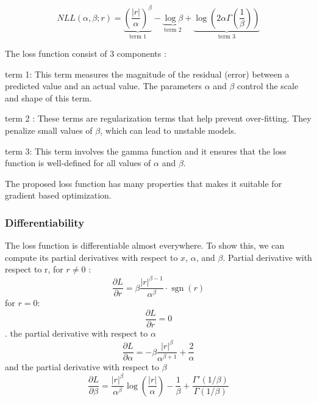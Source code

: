 \documentclass[letterpaper, 10 pt, conference]{ieeeconf}  %
\begin{document}
\begin{equation}
   NLL(\alpha, \beta; r)  = \underbrace{ \left(\frac{\left|{r}\right|}{\alpha}\right)^{\beta}}_\textrm{term 1} - \underbrace{\log{\beta}}_\textrm{term 2} + \underbrace{\log{\left( 2\alpha \Gamma\left(\frac{1}{\beta}\right)\right) }}_\textrm{term 3}
\end{equation}

The loss function consist of 3 components : 
\begin{inparaitem}
    \item 
 term 1: This term measures the magnitude of the residual (error) between a predicted value and an actual value. The parameters $\alpha$ and $\beta$ control the scale and shape of this term.
     \item term 2 : These terms are regularization terms that help prevent over-fitting. They penalize small values of $\beta$, which can lead to unstable models.
    \item term 3: This term involves the gamma function and it ensures that the loss function is well-defined for all values of $\alpha$ and $\beta$.
\end{inparaitem}

The proposed loss function has many properties that makes it suitable for gradient based optimization. 
\subsubsection{Differentiability} 
The loss function is differentiable almost everywhere. To show this, we can compute its partial derivatives with respect to $x$, $\alpha$, and $\beta$. Partial derivative with respect to r, for $r \neq 0 $ : 
    \begin{equation*}
    \frac{\partial L}{\partial r} = \beta \frac{|r|^{\beta-1}}{\alpha^{\beta}} \cdot \operatorname{sgn}(r)
\end{equation*}
for $r=0$:
\begin{equation*}
    \frac{\partial L}{\partial r} = 0
\end{equation*} . the partial derivative with respect to $\alpha$ 
\begin{equation*}
    \frac{\partial L}{\partial \alpha} = -\beta \frac{|r|^{\beta}}{\alpha^{\beta+1}} + \frac{2}{\alpha}
\end{equation*} and
the partial derivative with respect to $\beta$ 
\begin{equation*}
    \frac{\partial L}{\partial \beta} = \frac{|r|^{\beta}}{\alpha^{\beta}} \log \left( \frac{|r|}{\alpha} \right) - \frac{1}{\beta} + \frac{\Gamma'(1/\beta)}{\Gamma(1/\beta)}
\end{equation*}
\end{document}
